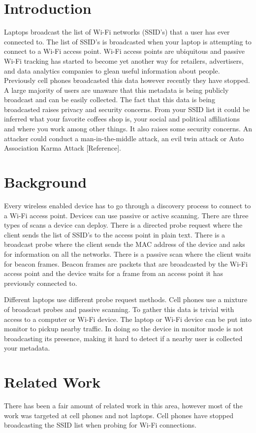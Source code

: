 \documentclass[letterpaper,twocolumn,10pt]{article}
\begin{document}
\section{Introduction}
Laptops broadcast the list of Wi-Fi networks (SSID's) that a user has ever connected to. The list of SSID's is broadcasted when your laptop is attempting to connect to a Wi-Fi access point. Wi-Fi access points are ubiquitous and passive Wi-Fi tracking has started to become yet another way for retailers, advertisers, and data analytics companies to glean useful information about people. Previously cell phones broadcasted this data however recently they have stopped. A large majority of users are unaware that this metadata is being publicly broadcast and can be easily collected. The fact that this data is being broadcasted raises privacy and security concerns. From your SSID list it could be inferred what your favorite coffees shop is, your social and political affiliations and where you work among other things. It also raises some security concerns. An attacker could conduct a man-in-the-middle attack, an evil twin attack or Auto Association Karma Attack [Reference]. 

\section{Background}

Every wireless enabled device has to go through a discovery process to connect to a Wi-Fi access point. Devices can use passive or active scanning. There are three types of scans a device can deploy. There is a directed probe request where the client sends the list of SSID's to the access point in plain text. There is a broadcast probe where the client sends the MAC address of the device and asks for information on all the networks. There is a passive scan where the client waits for beacon frames. Beacon frames are packets that are broadcasted by the Wi-Fi access point and the device waits for a frame from an access point it has previously connected to. 

Different laptops use different probe request methods. Cell phones use a mixture of broadcast probes and passive scanning. To gather this data is trivial with access to a computer or Wi-Fi device. The laptop or Wi-Fi device can be put into monitor to pickup nearby traffic. In doing so the device in monitor mode is not broadcasting its presence, making it hard to detect if a nearby user is collected your metadata.

\section{Related Work}
There has been a fair amount of related work in this area, however most of the work was targeted at cell phones and not laptops. Cell phones have stopped broadcasting the SSID list when probing for Wi-Fi connections.
\end{document}
